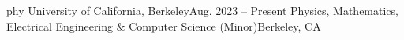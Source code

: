 phy\resumeSubHeadingListStart
    \resumeSubheading
      {University of California, Berkeley}{Aug. 2023 -- Present}
      {Physics, Mathematics, Electrical Engineering \& Computer Science (Minor)}{Berkeley, CA}
      \resumeItemListStart
      \resumeItemListEnd
  \resumeSubHeadingListEnd